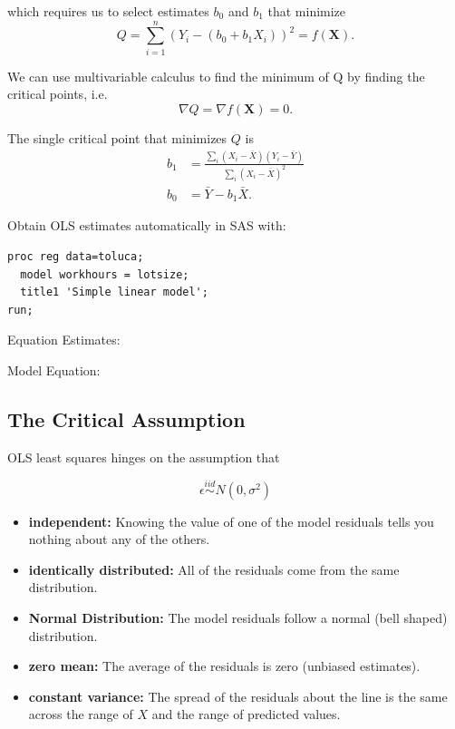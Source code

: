 \documentclass[12pt]{notes}
\begin{document}
which requires us to select estimates $b_0$ and $b_1$ that minimize
\[
Q = \sum_{i=1}^n\left(Y_i - \left(b_0 + b_1X_i \right) \right)^2 = f(\mathbf{X}).
\]

We can use multivariable calculus to find the minimum of Q by finding the critical points, i.e. 
\[\nabla Q = \nabla f(\mathbf{X}) = 0.\]

The single critical point that minimizes $Q$ is 
\begin{align*}
b_1 &= \frac{\sum_i (X_i - \bar{X})(Y_i - \bar{Y})}{\sum_i\left(X_i - \bar{X}\right)^2} \\
b_0 &= \bar{Y} - b_1\bar{X}.
\end{align*} 

Obtain OLS estimates automatically in SAS with:

\begin{verbatim}
proc reg data=toluca;
  model workhours = lotsize;
  title1 'Simple linear model';
run;
\end{verbatim}

\nspace
Equation Estimates:

\begin{minipage}[l][1cm][c]{\textwidth}
\end{minipage}

\nspace
Model Equation:

\begin{minipage}[l][1cm][c]{\textwidth}
\end{minipage}

\subsection*{The Critical Assumption}
OLS least squares hinges on the assumption that

\[\epsilon \stackrel{iid}{\sim} N(0, \sigma^2)\]

\begin{itemize}
\item \textbf{independent:} Knowing the value of one of the model residuals tells you nothing about any of the others. 
\item \textbf{identically distributed:} All of the residuals come from the same distribution.
\item \textbf{Normal Distribution:} The model residuals follow a normal (bell shaped) distribution. 
\item \textbf{zero mean:} The average of the residuals is zero (unbiased estimates). 
\item \textbf{constant variance:} The spread of the residuals about the line is the same across the range of $X$ and the range of predicted values. 
\end{itemize}
\end{document}
